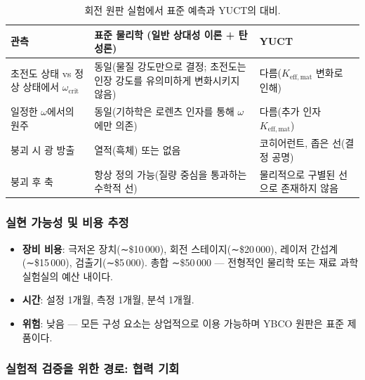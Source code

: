 \documentclass[12pt,a4paper]{article}
\begin{document}
	\begin{table}[h]
		\centering
		\caption{회전 원판 실험에서 표준 예측과 YUCT의 대비.}
		\label{tab:experiment_predictions}
		\begin{tabular}{p{5cm}p{4cm}p{4cm}}
			\toprule
			\textbf{관측} & \textbf{표준 물리학 (일반 상대성 이론 + 탄성론)} & \textbf{YUCT} \\
			\midrule
			초전도 상태 vs 정상 상태에서 \(\omega_{\text{crit}}\) & 동일(물질 강도만으로 결정; 초전도는 인장 강도를 유의미하게 변화시키지 않음) & 다름(\(K_{\mathrm{eff,mat}}\) 변화로 인해) \\
			일정한 \(\omega\)에서의 원주 & 동일(기하학은 로렌츠 인자를 통해 \(\omega\)에만 의존) & 다름(추가 인자 \(K_{\mathrm{eff,mat}}\)) \\
			붕괴 시 광 방출 & 열적(흑체) 또는 없음 & 코히어런트, 좁은 선(결정 공명) \\
			붕괴 후 축 & 항상 정의 가능(질량 중심을 통과하는 수학적 선) & 물리적으로 구별된 선으로 존재하지 않음 \\
			\bottomrule
		\end{tabular}
	\end{table}
	
	\subsubsection{실현 가능성 및 비용 추정}
	
	\begin{itemize}
		\item \textbf{장비 비용}: 극저온 장치(∼\$10 000), 회전 스테이지(∼\$20 000), 레이저 간섭계(∼\$15 000), 검출기(∼\$5 000). 총합 ∼\$50 000 — 전형적인 물리학 또는 재료 과학 실험실의 예산 내이다.
		\item \textbf{시간}: 설정 1개월, 측정 1개월, 분석 1개월.
		\item \textbf{위험}: 낮음 — 모든 구성 요소는 상업적으로 이용 가능하며 YBCO 원판은 표준 제품이다.
	\end{itemize}
	
	\subsubsection{실험적 검증을 위한 경로: 협력 기회}
	
\end{document}
